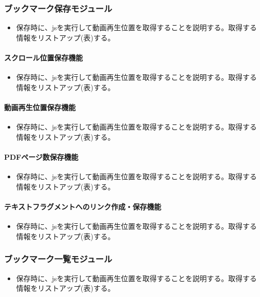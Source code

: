 \subsubsection{ブックマーク保存モジュール}
\begin{itemize}
  \item 保存時に、jsを実行して動画再生位置を取得することを説明する。取得する情報をリストアップ(表)する。
\end{itemize}

\paragraph{スクロール位置保存機能}
\begin{itemize}
  \item 保存時に、jsを実行して動画再生位置を取得することを説明する。取得する情報をリストアップ(表)する。
\end{itemize}

\paragraph{動画再生位置保存機能}
\begin{itemize}
  \item 保存時に、jsを実行して動画再生位置を取得することを説明する。取得する情報をリストアップ(表)する。
\end{itemize}

\paragraph{PDFページ数保存機能}
\begin{itemize}
  \item 保存時に、jsを実行して動画再生位置を取得することを説明する。取得する情報をリストアップ(表)する。
\end{itemize}

\paragraph{テキストフラグメントへのリンク作成・保存機能}
\begin{itemize}
  \item 保存時に、jsを実行して動画再生位置を取得することを説明する。取得する情報をリストアップ(表)する。
\end{itemize}

\subsubsection{ブックマーク一覧モジュール}
\begin{itemize}
  \item 保存時に、jsを実行して動画再生位置を取得することを説明する。取得する情報をリストアップ(表)する。
\end{itemize}

